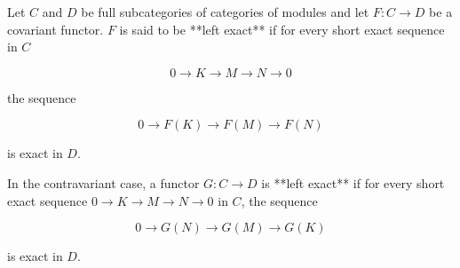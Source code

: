 Let $C$ and $D$ be full subcategories of categories of modules and let $F: C \to D$ be a covariant functor. $F$ is said to be **left exact** if for every short exact sequence in $C$

$$0 \to K \to M \to N \to 0$$

the sequence

$$0 \to F(K) \to F(M) \to F(N)$$

is exact in $D$.

In the contravariant case, a functor $G: C \to D$ is **left exact** if for every short exact sequence $0 \to K \to M \to N \to 0$ in $C$, the sequence

$$0 \to G(N) \to G(M) \to G(K)$$

is exact in $D$.
